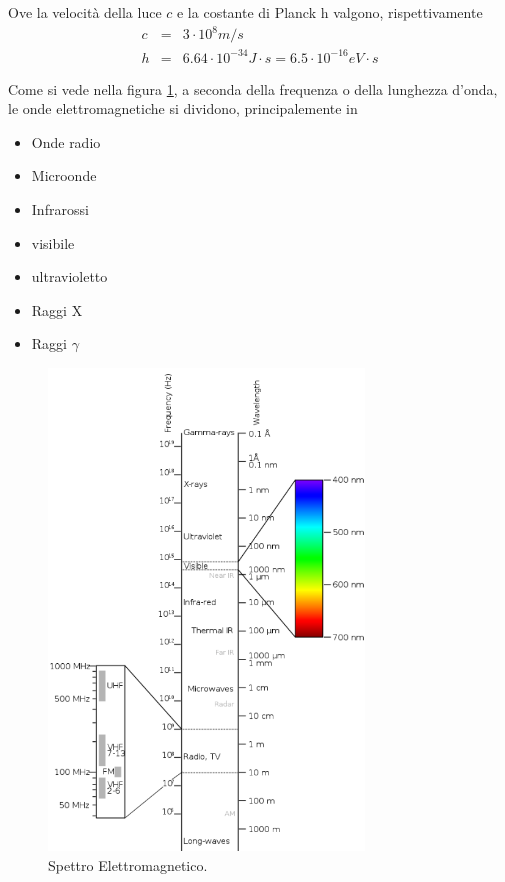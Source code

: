 \documentclass[17pt]{extarticle}
\begin{document}
Ove la velocità della luce $c$ e la costante di Planck h valgono, rispettivamente
\begin{eqnarray}
	c & = & 3\cdot 10^8m/s\\
	h & = & 6.64\cdot 10^{-34}J\cdot s = 6.5\cdot 10^{-16} eV\cdot s
\end{eqnarray}


Come si vede nella figura \ref{fig:spettroElettromagnetico}, a seconda della frequenza o della lunghezza d'onda, le onde elettromagnetiche si dividono, principalemente in 

\begin{itemize}
	\item Onde radio
	\item Microonde
	\item Infrarossi
	\item visibile
	\item ultravioletto
	\item Raggi X
	\item Raggi $\gamma$
\end{itemize}

\begin{figure}[b!]		%
	\centering
   	\includegraphics[width=3.3in]{spettroElettromagnetico.png}%
  	\caption{Spettro Elettromagnetico.}
   	\label{fig:spettroElettromagnetico}%
\end{figure}
\end{document}
